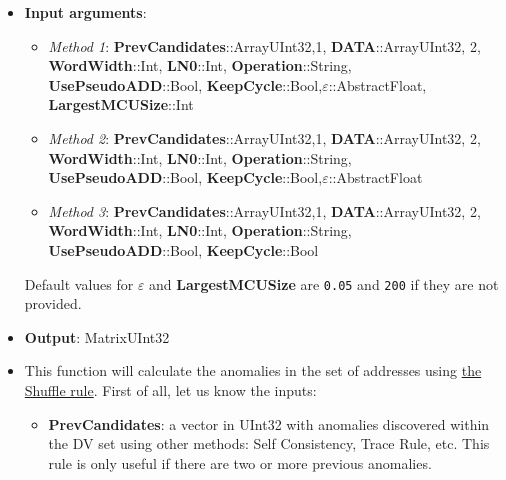  \begin{itemize}
 	\item \textbf{Input arguments}: 
 		\begin{itemize}
 			\item \textit{Method 1}: \textbf{PrevCandidates}::Array{UInt32,1}, \textbf{DATA}::Array{UInt32, 2}, \textbf{WordWidth}::Int, \textbf{LN0}::Int,  \textbf{Operation}::String, \textbf{UsePseudoADD}::Bool, \textbf{KeepCycle}::Bool,\textbf{\(\varepsilon\)}::AbstractFloat, \textbf{LargestMCUSize}::Int
 			\item \textit{Method 2}:
 			\textbf{PrevCandidates}::Array{UInt32,1}, \textbf{DATA}::Array{UInt32, 2}, \textbf{WordWidth}::Int, \textbf{LN0}::Int,  \textbf{Operation}::String, \textbf{UsePseudoADD}::Bool, \textbf{KeepCycle}::Bool,\textbf{\(\varepsilon\)}::AbstractFloat
 			\item \textit{Method 3}: 			%
 			\textbf{PrevCandidates}::Array{UInt32,1}, \textbf{DATA}::Array{UInt32, 2}, \textbf{WordWidth}::Int, \textbf{LN0}::Int,  \textbf{Operation}::String, \textbf{UsePseudoADD}::Bool, \textbf{KeepCycle}::Bool
 		\end{itemize}
 		Default values for \textbf{\(\varepsilon\)} and \textbf{LargestMCUSize} are \texttt{0.05} and \texttt{200} if they are not provided.
 		\item \textbf{Output}: Matrix{UInt32}
 		\item This function will calculate the anomalies in the set of addresses using \hyperref[Subsec:ShuffleRule]{the Shuffle rule}. 
 		First of all, let us know the inputs:
 		\begin{itemize}
 			
 			\item \textbf{PrevCandidates}: a vector in UInt32 with anomalies discovered within the DV set using other methods: Self Consistency, Trace Rule, etc. This rule is only useful if there are two or more previous anomalies. 
 			

\end{itemize}
\end{itemize}
